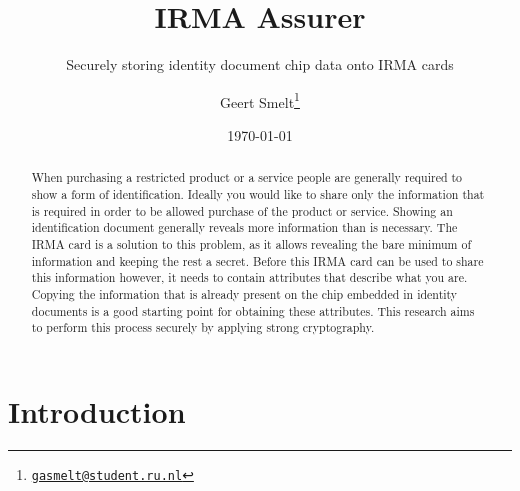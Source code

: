 \documentclass[a4paper, oneside]{scrartcl}
\author{Geert Smelt\thanks{\href{mailto:gasmelt@student.ru.nl}{\nolinkurl{gasmelt@student.ru.nl}}}}
\title{IRMA Assurer}
\subtitle{Securely storing identity document chip data onto IRMA cards}
\date{\today}
\begin{document}
\maketitle
\vspace{2.5cm}
\begin{abstract}
\noindent
When purchasing a restricted product or a service people are generally required to show a form of identification. Ideally you would like to share only the information that is required in order to be allowed purchase of the product or service. Showing an identification document generally reveals more information than is necessary. The IRMA card is a solution to this problem, as it allows revealing the bare minimum of information and keeping the rest a secret. Before this IRMA card can be used to share this information however, it needs to contain attributes that describe what you are. Copying the information that is already present on the chip embedded in identity documents is a good starting point for obtaining these attributes. This research aims to perform this process securely by applying strong cryptography.
\end{abstract}

\clearpage
\section{Introduction}
\end{document}
